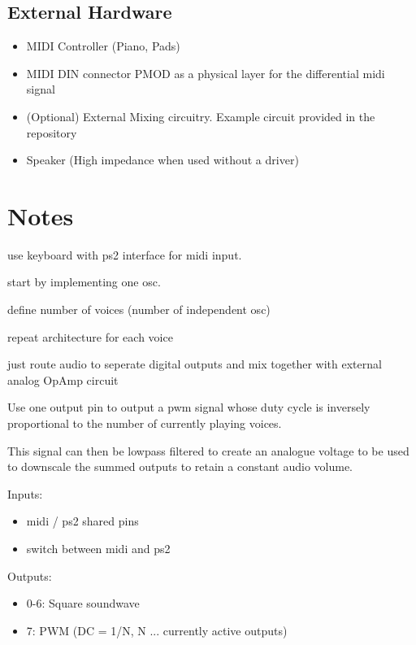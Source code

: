 \documentclass[a4paper,oneside,11pt,english]{scrartcl}
\begin{document}
\subsection{External Hardware}

\begin{itemize}
    \item MIDI Controller (Piano, Pads)
    \item MIDI DIN connector PMOD as a physical layer for the differential midi signal
    \item (Optional) External Mixing circuitry. Example circuit provided in the repository
    \item Speaker (High impedance when used without a driver)
\end{itemize}

\section{Notes}

use keyboard with ps2 interface for midi input.

start by implementing one osc.

define number of voices (number of independent osc)

repeat architecture for each voice 

just route audio to seperate digital outputs and mix together with external analog OpAmp circuit

Use one output pin to output a pwm signal whose duty cycle is inversely proportional to the number of currently playing voices.

This signal can then be lowpass filtered to create an analogue voltage to be used to downscale the summed outputs to retain a constant audio volume.

Inputs:

\begin{itemize}
    \item midi / ps2 shared pins
    \item switch between midi and ps2
\end{itemize}

Outputs:

\begin{itemize}
    \item 0-6: Square soundwave
    \item 7: PWM (DC = 1/N, N ... currently active outputs)
\end{itemize}

\end{document}
